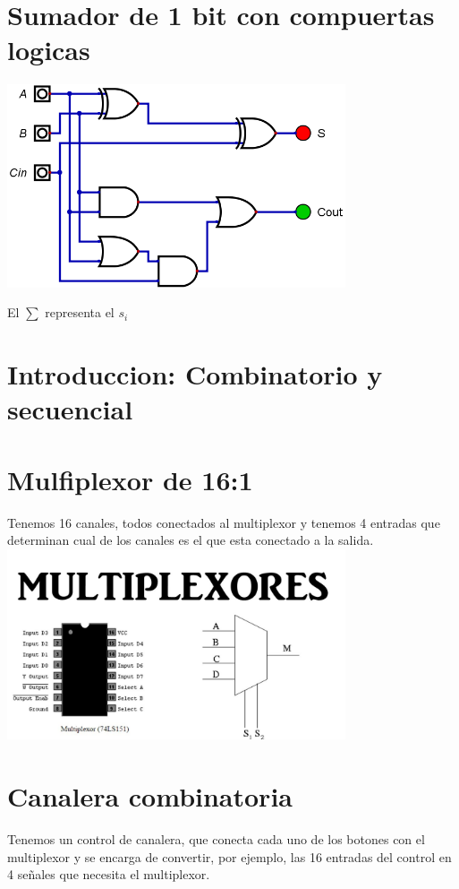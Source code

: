 \documentclass{report}
\begin{document}
\section{Sumador de 1 bit con compuertas logicas}

\includegraphics[width=10cm]{../Assets/SumadorCompleto.png}

El $\sum$ representa el $s_i$


\section{Introduccion: Combinatorio y secuencial}

\section{Mulfiplexor de 16:1}
Tenemos 16 canales, todos conectados al multiplexor y tenemos 4 entradas que determinan
cual de los canales es el que esta conectado a la salida.
\includegraphics[width=10cm]{../Assets/multiplexor.jpg}

\section{Canalera combinatoria}

Tenemos un control de canalera, que conecta cada uno de los botones con el multiplexor y se encarga de convertir, por ejemplo, las 16 entradas del control en 4 señales que necesita el multiplexor.
\end{document}
